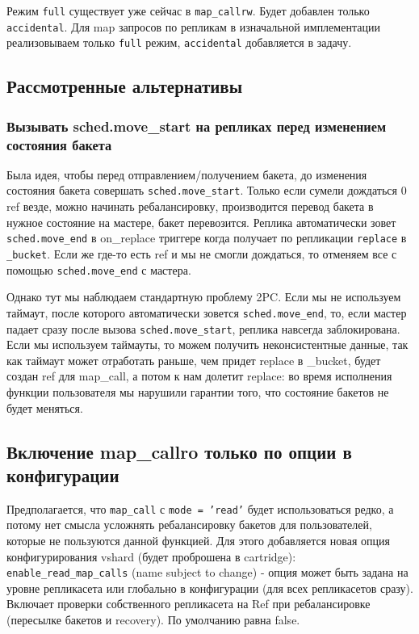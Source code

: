 Режим \texttt{full} существует уже сейчас в \texttt{map\_callrw}. Будет
добавлен только \texttt{accidental}. Для map запросов по репликам в изначальной
имплементации реализовываем только \texttt{full} режим, \texttt{accidental}
добавляется в задачу.

\subsection{Рассмотренные альтернативы}

\subsubsection*{Вызывать sched.move\_start на репликах перед изменением состояния бакета}

Была идея, чтобы перед отправлением/получением бакета, до изменения состояния
бакета совершать \texttt{sched.move\_start}. Только если сумели дождаться 0
ref везде, можно начинать ребалансировку, производится перевод бакета в
нужное состояние на мастере, бакет перевозится. Реплика автоматически зовет
\texttt{sched.move\_end} в on\_replace триггере когда получает по репликации
\texttt{replace} в \texttt{\_bucket}. Если же где-то есть ref и мы не смогли
дождаться, то отменяем все с помощью \texttt{sched.move\_end} с мастера.

Однако тут мы наблюдаем стандартную проблему 2PC. Если мы не используем
таймаут, после которого автоматически зовется \texttt{sched.move\_end}, то,
если мастер падает сразу после вызова \texttt{sched.move\_start}, реплика
навсегда заблокирована. Если мы используем таймауты, то можем получить
неконсистентные данные, так как таймаут может отработать раньше, чем придет
replace в \_bucket, будет создан ref для map\_call, а потом к нам долетит
replace: во время исполнения функции пользователя мы нарушили гарантии того,
что состояние бакетов не будет меняться.

\subsection*{Включение map\_callro только по опции в конфигурации}

Предполагается, что \texttt{map\_call} с \texttt{mode = 'read'} будет
использоваться редко, а потому нет смысла усложнять ребалансировку бакетов для
пользователей, которые не пользуются данной функцией. Для этого добавляется
новая опция конфигурирования vshard (будет проброшена в cartridge):
\texttt{enable\_read\_map\_calls} (name subject to change) - опция может быть
задана на уровне репликасета или глобально в конфигурации (для всех
репликасетов сразу). Включает проверки собственного репликасета на Ref при
ребалансировке (пересылке бакетов и recovery). По умолчанию равна false.

